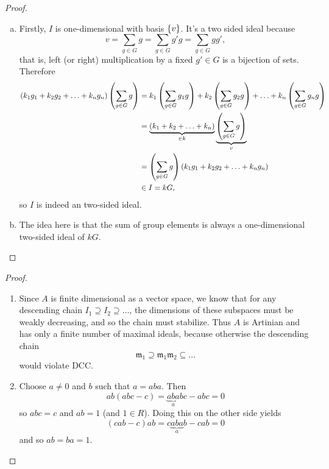 \documentclass{article}
\begin{document}
\begin{proof} ~
  \begin{enumerate}[(a)]
    \item Firstly, $I$ is one-dimensional with basis $\left\{ v \right\}$. It's a two
      sided ideal because \[
        v = \sum_{g \in G} g = \sum_{g \in G} g'g = \sum_{g \in G} gg',
      \] that is, left (or right) multiplication by a fixed $g' \in G$ is a
      bijection of sets. Therefore \begin{align*}
        (k_1g_1 + k_2g_2 + \hdots + k_ng_n)\left( \sum_{g \in G} g \right)
        &= k_1\left( \sum_{g \in G} g_1g \right) + k_2\left( \sum_{g \in G} g_2g \right) + \hdots + k_n\left( \sum_{g \in G} g_ng \right) \\
        &= \underbrace{(k_1 + k_2 + \hdots + k_n)}_{\in k}\underbrace{\left( \sum_{g \in G} g \right)}_{v} \\
        &= \left( \sum_{g \in G} g \right)(k_1g_1 + k_2g_2 + \hdots + k_ng_n) \\
        &\in I = kG,
      \end{align*}
      so $I$ is indeed an two-sided ideal.
    \item The idea here is that the sum of group elements is always a
    one-dimensional two-sided ideal of $kG$.
  \end{enumerate}
\end{proof}
\pagebreak
\begin{problem}{3}
\end{problem}

\begin{proof}
  \begin{enumerate}
    \item Since $A$ is finite dimensional as a vector space, we know that for
    any descending chain $I_1 \supseteq I_2 \supseteq \hdots$, the dimensions of
    these subspaces must be weakly decreasing, and so the chain must stabilize.
    Thus $A$ is Artinian and has only a finite number of maximal ideals, because
    otherwise the descending chain
    \[
      \mathfrak{m}_1 \supseteq \mathfrak{m}_1\mathfrak{m}_2 \subseteq \hdots
    \] would violate DCC.
    \item
    Choose $a \neq 0$ and $b$ such that $a = aba$. Then \[
      ab(abc - c) = \underbrace{aba}_abc - abc = 0
    \]  so $abc = c$ and $ab = 1$ (and $1 \in R$). Doing this on the other side yields \[
      (cab - c)ab = c\underbrace{aba}_ab - cab = 0
    \] and so $ab = ba = 1$.

  \end{enumerate}
\end{proof}
\pagebreak
\begin{problem}{4} %
\end{problem}
\end{document}
